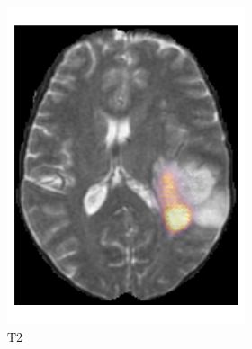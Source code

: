 \begin{figure}[htbp]
\begin{subfigure}[b]{\textwidth}
\begin{subfigure}[b]{0.24\textwidth}
        \includegraphics[width=\textwidth]{Figures/saliency_LGG_T2.png}
        \caption*{\acrshort{T2}}
        \end{subfigure}
        \hfill
        \begin{subfigure}[b]{0.24\textwidth}

\end{subfigure}
\end{subfigure}
\end{figure}
